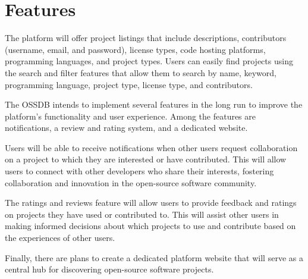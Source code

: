 \pagebreak
\section{Features}

The platform will offer project listings that include descriptions, contributors
(username, email, and password), license types, code hosting platforms,
programming languages, and project types.
Users can easily find projects using the search and filter features that allow them
to search by name, keyword, programming language, project type, license type, and contributors. 

The OSSDB intends to implement several features in the long run to improve the platform's
functionality and user experience.
Among the features are notifications, a review and rating system, and a dedicated website. 

Users will be able to receive notifications when other users request collaboration
on a project to which they are interested or have contributed.
This will allow users to connect with other developers who share their interests,
fostering collaboration and innovation in the open-source software community. 

The ratings and reviews feature will allow users to provide feedback and ratings on
projects they have used or contributed to.
This will assist other users in making informed decisions about which projects
to use and contribute based on the experiences of other users. 

Finally, there are plans to create a dedicated platform website that
will serve as a central hub for discovering open-source software projects. 
